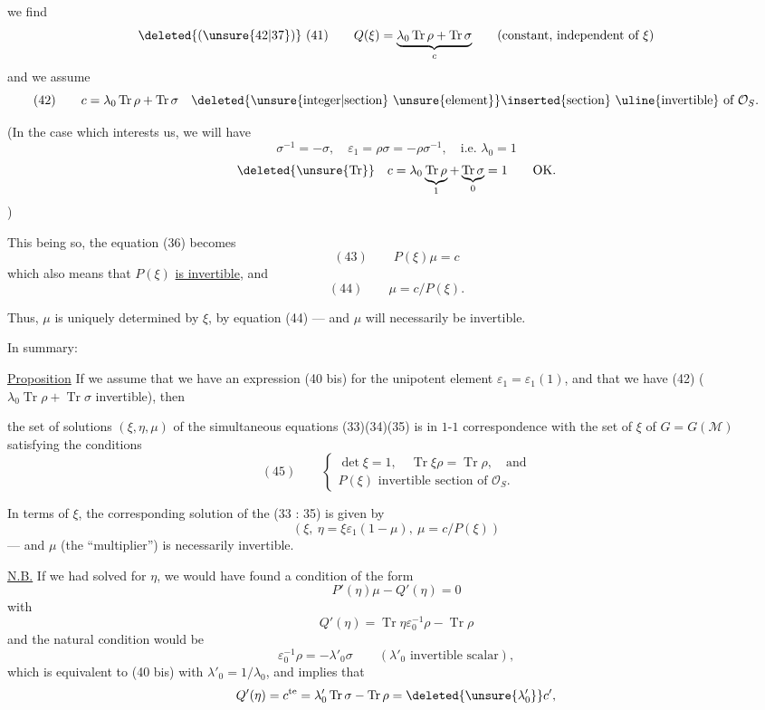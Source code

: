 
we find
\[
\deleted{(\unsure{42|37})}\ (41)\qquad
Q(\xi)=\underbrace{\lambda_0\operatorname{Tr}\rho+\operatorname{Tr}\sigma}_{c}
\qquad
(\text{constant, independent of }\xi)
\]
and we assume
\[
(42)\qquad
c=\lambda_0\operatorname{Tr}\rho+\operatorname{Tr}\sigma
\quad
\deleted{\text{\unsure{integer|section} \unsure{element}}}
\inserted{\text{section}}\text{ \uline{invertible} of }\mathcal O_S.
\]

(In the case which interests us, we will have
\[
\sigma^{-1}=-\sigma,\quad
\varepsilon_1=\rho\sigma=-\rho\sigma^{-1},\quad
\text{i.e. }\lambda_0=1
\]
\[
\deleted{\unsure{\operatorname{Tr}}}\quad
c=\lambda_0\underbrace{\operatorname{Tr}\rho}_{1}
+\underbrace{\operatorname{Tr}\sigma}_{0}=1
\qquad\text{OK.}
\]
)

This being so, the  equation (36) becomes
\[
(43)\qquad P(\xi)\mu=c
\]
which also means that $P(\xi)$ \uline{is invertible}, and
\[
(44)\qquad \mu=c/P(\xi).
\]

Thus, $\mu$ is uniquely determined by $\xi$, by equation (44) ---
and $\mu$ will necessarily be invertible.

In summary:

\uline{Proposition} If we assume that we have 
an expression (40 bis) for the unipotent element
$\varepsilon_1=\varepsilon_1(1)$, and that we have (42)
($\lambda_0\operatorname{Tr}\rho+\operatorname{Tr}\sigma$ invertible), then


the set of solutions  $(\xi,\eta,\mu)$ of the
simultaneous equations (33)(34)(35)
is in $1$-$1$ correspondence with the set of $\xi$
 of $G=G(\mathcal{M})$
satisfying the conditions
\[
(45)\qquad
\left\{
\begin{gathered}
\det\xi=1,\quad \operatorname{Tr}\xi\rho=\operatorname{Tr}\rho,\quad\text{and}\\
P(\xi)\text{ invertible section of }\mathcal O_S.
\end{gathered}
\right.
\]

In terms of $\xi$, the corresponding solution of the  (33 : 35)
is given by
\[
(\xi,\ \eta=\xi\varepsilon_1(1-\mu),\ \mu=c/P(\xi))
\]
--- and $\mu$ (the ``multiplier'') is necessarily invertible.

\uline{N.B.} If we had solved for $\eta$, we would have
found a condition of the form
\[
P'(\eta)\mu-Q'(\eta)=0
\]
with
\[
Q'(\eta)=\operatorname{Tr}\eta\varepsilon_0^{-1}\rho-\operatorname{Tr}\rho
\]
and the natural condition would be
\[
\varepsilon_0^{-1}\rho=-\lambda'_0\sigma
\qquad(\lambda'_0\text{ invertible scalar}),
\]
which is equivalent to (40 bis) with $\lambda'_0=1/\lambda_0$,
and implies that
\[
Q'(\eta)=c^{\mathrm{te}}
=\lambda'_0\operatorname{Tr}\sigma-\operatorname{Tr}\rho
=\deleted{\unsure{\lambda'_0}}c',
\]


